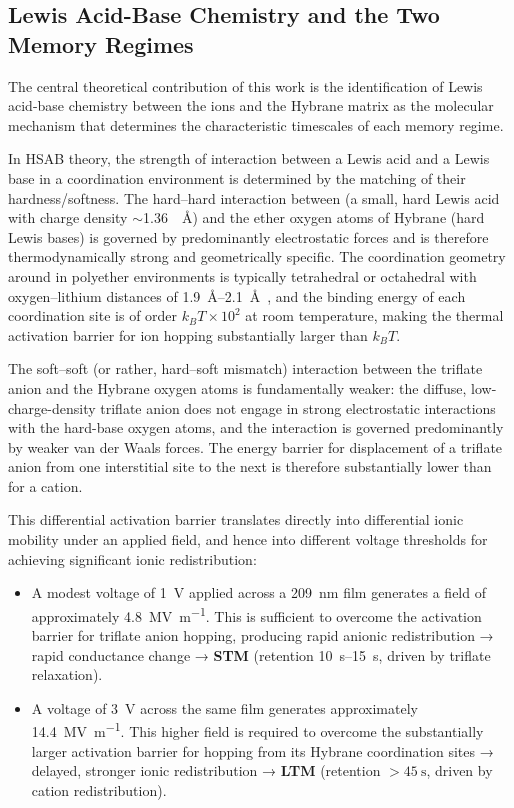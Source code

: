 \documentclass[12pt, a4paper, twoside]{report}
\begin{document}
\subsection{Lewis Acid-Base Chemistry and the Two Memory Regimes}\label{subsec:lewis}

The central theoretical contribution of this work is the identification of Lewis acid-base chemistry between the ions and the Hybrane matrix as the molecular mechanism that determines the characteristic timescales of each memory regime.

In HSAB theory, the strength of interaction between a Lewis acid and a Lewis base in a coordination environment is determined by the matching of their hardness/softness. The hard--hard interaction between  (a small, hard Lewis acid with charge density $\sim$\SI{1.36}{\per\angstrom}) and the ether oxygen atoms of Hybrane (hard Lewis bases) is governed by predominantly electrostatic forces and is therefore thermodynamically strong and geometrically specific. The coordination geometry around  in polyether environments is typically tetrahedral or octahedral with oxygen--lithium distances of \SIrange{1.9}{2.1}{\angstrom}~\cite{Lightfoot1993}, and the binding energy of each coordination site is of order $k_BT \times 10^2$ at room temperature, making the thermal activation barrier for ion hopping substantially larger than $k_BT$.

The soft--soft (or rather, hard--soft mismatch) interaction between the  triflate anion and the Hybrane oxygen atoms is fundamentally weaker: the diffuse, low-charge-density triflate anion does not engage in strong electrostatic interactions with the hard-base oxygen atoms, and the interaction is governed predominantly by weaker van der Waals forces. The energy barrier for displacement of a triflate anion from one interstitial site to the next is therefore substantially lower than for a  cation.

This differential activation barrier translates directly into differential ionic mobility under an applied field, and hence into different voltage thresholds for achieving significant ionic redistribution:

\begin{itemize}
  \item A modest voltage of \SI{1}{\volt} applied across a \SI{209}{\nano\metre} film generates a field of approximately \SI{4.8}{\mega\volt\per\metre}. This is sufficient to overcome the activation barrier for triflate anion hopping, producing rapid anionic redistribution → rapid conductance change → \textbf{STM} (retention \SIrange{10}{15}{\second}, driven by triflate relaxation).

  \item A voltage of \SI{3}{\volt} across the same film generates approximately \SI{14.4}{\mega\volt\per\metre}. This higher field is required to overcome the substantially larger activation barrier for  hopping from its Hybrane coordination sites → delayed, stronger ionic redistribution → \textbf{LTM} (retention $> \SI{45}{\second}$, driven by cation redistribution).
\end{itemize}
\end{document}

